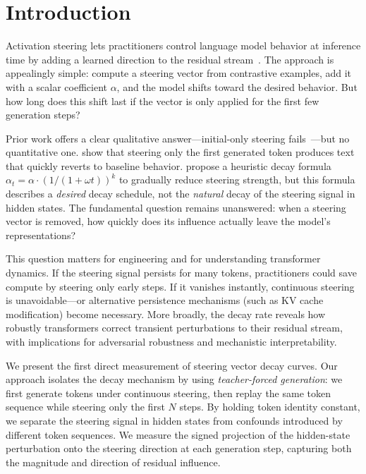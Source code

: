 \section{Introduction}
\label{sec:intro}

Activation steering lets practitioners control language model behavior at inference time by adding a learned direction to the residual stream~\citep{turner2023steering,rimsky2024steering}. The approach is appealingly simple: compute a steering vector from contrastive examples, add it with a scalar coefficient $\alpha$, and the model shifts toward the desired behavior. But how long does this shift last if the vector is only applied for the first few generation steps?

Prior work offers a clear qualitative answer---initial-only steering fails~\citep{scalena2024dynamic}---but no quantitative one. \citet{scalena2024dynamic} show that steering only the first generated token produces text that quickly reverts to baseline behavior. \citet{xie2025comparative} propose a heuristic decay formula $\alpha_t = \alpha \cdot (1/(1 + \omega t))^k$ to gradually reduce steering strength, but this formula describes a \emph{desired} decay schedule, not the \emph{natural} decay of the steering signal in hidden states. The fundamental question remains unanswered: when a steering vector is removed, how quickly does its influence actually leave the model's representations?

This question matters for engineering and for understanding transformer dynamics. If the steering signal persists for many tokens, practitioners could save compute by steering only early steps. If it vanishes instantly, continuous steering is unavoidable---or alternative persistence mechanisms (such as KV cache modification) become necessary. More broadly, the decay rate reveals how robustly transformers correct transient perturbations to their residual stream, with implications for adversarial robustness and mechanistic interpretability.

We present the first direct measurement of steering vector decay curves. Our approach isolates the decay mechanism by using \emph{teacher-forced generation}: we first generate tokens under continuous steering, then replay the same token sequence while steering only the first $N$ steps. By holding token identity constant, we separate the steering signal in hidden states from confounds introduced by different token sequences. We measure the signed projection of the hidden-state perturbation onto the steering direction at each generation step, capturing both the magnitude and direction of residual influence.

